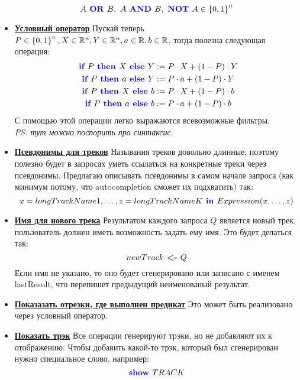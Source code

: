 \begin{itemize}
	\[
		A \text{\textbf{\color{blue}{ OR }}} B,\ A \text{\textbf{\color{blue}{ AND }}} B,\ \text{\textbf{\color{blue}{NOT }}} A \in  \left\lbrace 0, 1 \right\rbrace^n
	\]
	\item \textbf{\underline{Условный оператор}} Пускай теперь $P \in \left\lbrace 0, 1 \right\rbrace^n, X \in \mathbb{R}^n, Y \in \mathbb{R}^n, a \in \mathbb{R}, b \in \mathbb{R}$, тогда полезна следующая операция:
	\begin{align*}
		\text{\textbf{\color{blue}{ if }}} P \text{\textbf{\color{blue}{ then }}} X \text{\textbf{\color{blue}{ else }}} Y &:= P \cdot X + (1 - P) \cdot Y \\
		\text{\textbf{\color{blue}{ if }}} P \text{\textbf{\color{blue}{ then }}} a \text{\textbf{\color{blue}{ else }}} Y &:= P \cdot a + (1 - P) \cdot Y \\
		\text{\textbf{\color{blue}{ if }}} P \text{\textbf{\color{blue}{ then }}} X \text{\textbf{\color{blue}{ else }}} b &:= P \cdot X + (1 - P) \cdot b \\
		\text{\textbf{\color{blue}{ if }}} P \text{\textbf{\color{blue}{ then }}} a \text{\textbf{\color{blue}{ else }}} b &:= P \cdot a + (1 - P) \cdot b
	\end{align*}
	С помощью этой операции легко выражаются всевозможные фильтры.
	\\\emph{PS: тут можно поспорить про синтаксис}.
	\item \textbf{\underline{Псевдонимы для треков}} Называния треков довольно длинные, поэтому полезно будет в запросах уметь ссылаться на конкретные треки через псевдонимы. Предлагаю описывать псевдонимы в самом начале запроса (как минимум потому, что autocompletion сможет их подхватить) так:
	\[
		x = longTrackName1, \ldots, z = longTrackNameK \text{\textbf{\color{blue}{ in }}} Expression(x, \ldots, z)
	\]
	\item \textbf{\underline{Имя для нового трека}} Результатом каждого запроса $Q$ является новый трек, пользователь должен иметь возможность задать ему имя. Это будет делаться так:
	\[
		newTrack \text{\textbf{\color{blue}{ <- }}} Q
	\]
	Если имя не указано, то оно будет сгенерировано или записано с именем lastResult, что перепишет предыдущий неименованый результат.

	\item \textbf{\underline{Показазать отрезки, где выполнен предикат}} Это может быть реализовано через условный оператор.

	\item \textbf{\underline{Показать трэк}} Все операции генерируют трэки, но не добавляют их к отображению. Чтобы добавить какой-то трэк, который был сгенерирован нужно специальное слово, например:
	\[
		\text{\textbf{\color{blue}{show }}} TRACK
	\]
\end{itemize}

